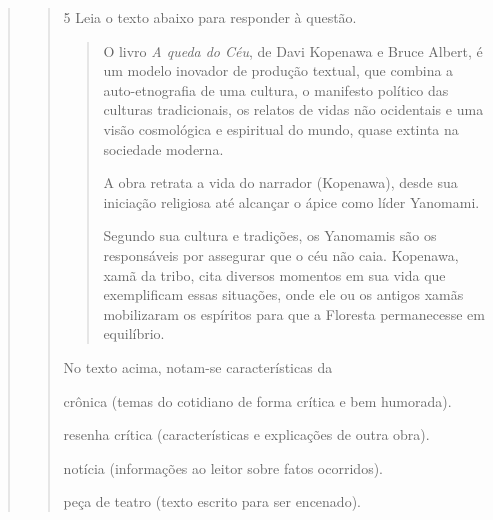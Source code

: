 \begin{quote}
\begin{quote}
\num{5} Leia o texto abaixo para responder à questão. 

\begin{quote}

O livro \textit{A queda do Céu}, de Davi Kopenawa e Bruce Albert, é um modelo
inovador de produção textual, que combina a auto-etnografia de uma
cultura, o manifesto político das culturas tradicionais, os relatos de
vidas não ocidentais e uma visão cosmológica e espiritual do mundo,
quase extinta na sociedade moderna.

A obra retrata a vida do narrador (Kopenawa), desde sua iniciação
religiosa até alcançar o ápice como líder Yanomami.

Segundo sua cultura e tradições, os Yanomamis são os responsáveis por
assegurar que o céu não caia. Kopenawa, xamã da tribo, cita diversos
momentos em sua vida que exemplificam essas situações, onde ele ou os
antigos xamãs mobilizaram os espíritos para que a Floresta permanecesse
em equilíbrio.

\end{quote}


No texto acima, notam-se características da

\begin{escolha}

    \item crônica (temas do cotidiano de forma crítica e bem humorada).

    \item resenha crítica (características e explicações de outra obra).

    \item notícia (informações ao leitor sobre fatos ocorridos).

    \item peça de teatro (texto escrito para ser encenado). 

\end{escolha}



\end{quote}
\end{quote}
